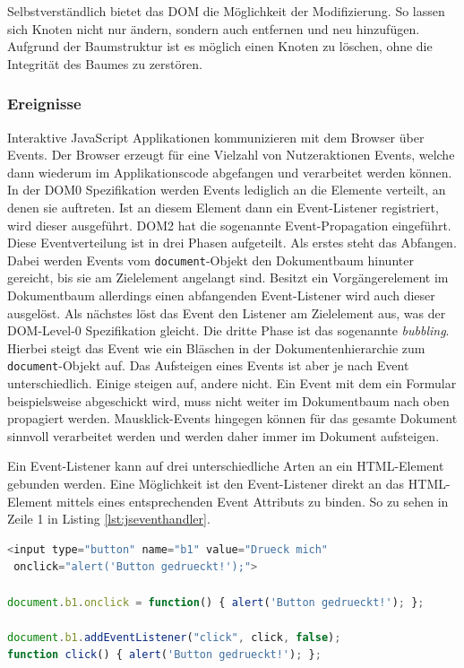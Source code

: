 Selbstverständlich bietet das DOM die Möglichkeit der Modifizierung. So lassen sich Knoten nicht nur ändern, sondern auch entfernen und neu hinzufügen. Aufgrund der Baumstruktur ist es möglich einen Knoten zu löschen, ohne die Integrität des Baumes zu zerstören.

\subsubsection{Ereignisse} Interaktive JavaScript Applikationen kommunizieren mit dem Browser über Events. Der Browser erzeugt für eine Vielzahl von Nutzeraktionen Events, welche dann wiederum im Applikationscode abgefangen und verarbeitet werden können. In der DOM0 Spezifikation werden Events lediglich an die Elemente verteilt, an denen sie auftreten. Ist an diesem Element dann ein Event-Listener registriert, wird dieser ausgeführt. DOM2 hat die sogenannte Event-Propagation eingeführt. Diese Eventverteilung ist in drei Phasen aufgeteilt. Als erstes steht das Abfangen. Dabei werden Events vom \texttt{document}-Objekt den Dokumentbaum hinunter gereicht, bis sie am Zielelement angelangt sind. Besitzt ein Vorgängerelement im Dokumentbaum allerdings einen abfangenden Event-Listener wird auch dieser ausgelöst. Als nächstes löst das Event den Listener am Zielelement aus, was der DOM-Level-0 Spezifikation gleicht. Die dritte Phase ist das sogenannte \textit{bubbling}. Hierbei steigt das Event wie ein Bläschen in der Dokumentenhierarchie zum \texttt{document}-Objekt auf. Das Aufsteigen eines Events ist aber je nach Event unterschiedlich. Einige steigen auf, andere nicht. Ein Event mit dem ein Formular beispielsweise abgeschickt wird, muss nicht weiter im Dokumentbaum nach oben propagiert werden. Mausklick-Events hingegen können für das gesamte Dokument sinnvoll verarbeitet werden und werden daher immer im Dokument aufsteigen.\par Ein Event-Listener kann auf drei unterschiedliche Arten an ein HTML-Element gebunden werden. Eine Möglichkeit ist den Event-Listener direkt an das HTML-Element mittels eines entsprechenden Event Attributs zu binden. So zu sehen in Zeile 1 in Listing \ref{lst:jseventhandler}. 

\vspace{1em}
\begin{lstlisting}[language=JavaScript, caption=JavaScript Event-Handler Beispiek, label=lst:jseventhandler]
<input type="button" name="b1" value="Drueck mich"
 onclick="alert('Button gedrueckt!');">

document.b1.onclick = function() { alert('Button gedrueckt!'); };

document.b1.addEventListener("click", click, false);
function click() { alert('Button gedrueckt!'); };
\end{lstlisting}

